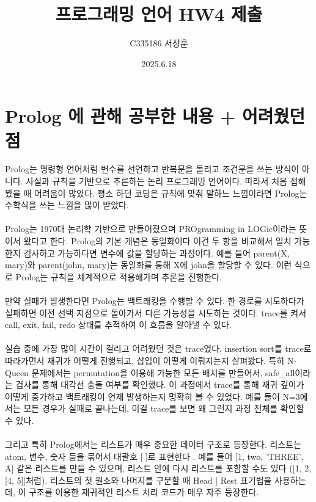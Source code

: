\documentclass{article}
\title{프로그래밍 언어 HW4 제출}
\author{C335186 서장훈}
\date{2025.6.18}
\begin{document}
\maketitle


\section{Prolog 에 관해 공부한 내용 + 어려웠던 점}

Prolog는 명령형 언어처럼 변수를 선언하고 반복문을 돌리고 조건문을 쓰는 방식이 아니다. 사실과 규칙을 기반으로 추론하는 논리 프로그래밍 언어이다. 따라서 처음 접해봤을 때 어려움이 많았다. 평소 하던 코딩은 규칙에 맞춰 말하느 느낌이라면 Prolog는 수학식을 쓰는 느낌을 많이 받았다. \\ \\
Prolog는 1970대 논리학 기반으로 만들어졌으며 PROgramming in LOGic이라는 뜻이서 왔다고 한다. 
Prolog의 기본 개념은 동일화이다 이건 두 항을 비교해서 일치 가능한지 검사하고 가능하다면 변수에 값을 할당하는 과정이다. 예를 들어 parent(X, mary)와 parent(john, mary)는 동일화를 통해 X에 john을 할당할 수 있다. 이런 식으로 Prolog는 규칙을 체계적으로 적용해가며 추론을 진행한다. \\ \\
만약 실패가 발생한다면 Prolog는 백트래킹을 수행할 수 있다. 한 경로를 시도하다가 실패하면 이전 선택 지점으로 돌아가서 다른 가능성을 시도하는 것이다. trace를 켜서 call, exit, fail, redo 상태를 추적하여 이 흐름을 알아낼 수 있다. \\ \\
실습 중에 가장 많이 시간이 걸리고 어려웠던 것은 trace였다. insertion sort를 trace로 따라가면서 재귀가 어떻게 진행되고, 삽입이 어떻게 이뤄지는지 살펴봤다. 
특히 N-Queen 문제에서는 permutation을 이용해 가능한 모든 배치를 만들어서, safe\_all이라는 검사를 통해 대각선 충돌 여부를 확인했다. 
이 과정에서 trace를 통해 재귀 깊이가 어떻게 증가하고 백트래킹이 언제 발생하는지 명확히 볼 수 있었다. 
예를 들어 N=3에서는 모든 경우가 실패로 끝나는데, 이걸 trace를 보면 왜 그런지 과정 전체를 확인할 수 있다. \\ \\
그리고 특히 Prolog에서는 리스트가 매우 중요한 데이터 구조로 등장한다. 리스트는 atom, 변수, 숫자 등을 묶어서 대괄호 [ ]로 표현한다
. 예를 들어 [1, two, 'THREE', A] 같은 리스트를 만들 수 있으며, 리스트 안에 다시 리스트를 포함할 수도 있다 ([1, 2, [4, 5]]처럼). 리스트의 첫 원소와 나머지를 구분할 때 Head | Rest 표기법을 사용하는데, 이 구조를 이용한 재귀적인 리스트 처리 코드가 매우 자주 등장한다. \\ \\
\end{document}
